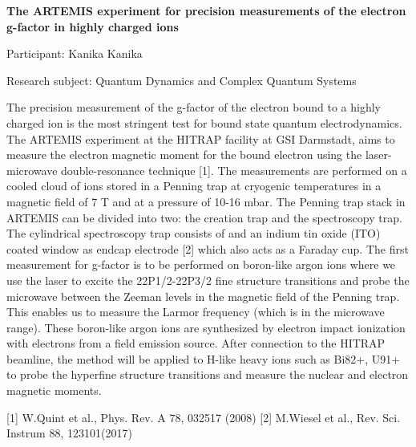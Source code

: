 \begin{minipage}[t]{1.0\textwidth}

\begin{center}

{{\large\bfseries The ARTEMIS experiment for precision measurements of the electron g-factor in highly charged ions}\par}

\end{center}

{\noindent Participant: Kanika Kanika\par} 

{\noindent Research subject: Quantum Dynamics and Complex Quantum Systems\par}\medskip

\noindent The precision measurement of the g-factor of the electron bound to a highly charged ion is the most stringent test for bound state quantum electrodynamics. The ARTEMIS experiment at the HITRAP facility at GSI Darmstadt, aims to measure the electron magnetic moment for the bound electron using the laser-microwave double-resonance technique [1]. The measurements are performed on a cooled cloud of ions stored in a Penning trap at cryogenic temperatures in a magnetic field of 7 T and at a pressure of 10-16 mbar. The Penning trap stack in ARTEMIS can be divided into two: the creation trap and the spectroscopy trap. The cylindrical spectroscopy trap consists of and an indium tin oxide (ITO) coated window as endcap electrode [2] which also acts as a Faraday cup. The first measurement for g-factor is to be performed on boron-like argon ions where we use the laser to excite the 22P1/2-22P3/2 fine structure transitions and probe the microwave between the Zeeman levels in the magnetic field of the Penning trap. This enables us to measure the Larmor frequency (which is in the microwave range). These boron-like argon ions are synthesized by electron impact ionization with electrons from a field emission source. After connection to the HITRAP beamline, the method will be applied to H-like heavy ions such as Bi82+, U91+ to probe the hyperfine structure transitions and measure the nuclear and electron magnetic moments.

[1] W.Quint et al., Phys. Rev. A 78, 032517 (2008)
[2] M.Wiesel et al., Rev. Sci. Instrum 88, 123101(2017)
\par\end{minipage}

\hfill 

